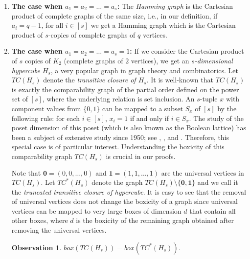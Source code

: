 \documentclass[twoside, 11pt]{article}
\newtheorem{observation}{Observation}
\newcommand{\TCH}[1]{TC(H_ {#1})}
\newcommand{\TTCH}[1]{TC^*(H_ {#1})}
\begin{document}
\begin{enumerate}

\item {\bf The case when $a_1 =a_2 = \ldots = a_s$:} The \textit{Hamming graph} is the Cartesian product of complete graphs of the same size, i.e., in our definition, if $a_i=q-1$, for all $i \in [s]$ we get a Hamming graph which is the Cartesian product of $s$-copies of complete graphs of $q$ vertices. 

\item  {\bf The case when $a_1 =a_2 = \ldots = a_s = 1$:} If we consider the Cartesian product of $s$ copies of $K_2$ (complete graphs of $2$ vertices), we get an \textit{$s$-dimensional hypercube} $H_s$, a very popular graph in graph theory and combinatorics. Let $TC(H_s)$ denote the \textit{transitive closure of $H_s$}.  It is well-known that  $TC(H_s)$ is exactly the comparability graph of the partial order defined on the power set of $[s]$, where the underlying relation is set inclusion. An $s$-tuple $x$ with component values from $\{0,1\}$ can be mapped to a subset $S_x$ of $[s]$ by the following rule: for each $i \in [s]$, 
$x_i = 1$ if and only if $i \in S_x$. The study of the poset dimension of this poset (which is also known as the Boolean lattice) has been a subject of extensive study since 1950; see \cite{dushnik1950concerning}, \cite{spencer1972minimal}, \cite{brightwell1994dimension} and \cite{kostochka1997dimension}. Therefore, this special case is of particular interest.  Understanding the boxicity of this comparability graph $TC(H_s)$ is crucial in our proofs.


Note that $\mathbf{0}=(0,0,\dots,0)$ and $\mathbf{1}=(1,1,\dots,1)$ are the universal vertices in $\TCH{s}$. Let $\TTCH{s}$ denote the graph $\TCH{s}\setminus \{\mathbf{0},\mathbf{1}\}$ and we call it the \textit{truncated transitive closure of hypercube}. It is easy to see that the removal of universal vertices does not change the boxicity of a graph since universal vertices can be mapped to very large boxes of dimension $d$ that contain all other boxes, where $d$ is the boxicity of the remaining graph obtained after removing the universal vertices. 

\begin{observation}
$box(\TCH{s})=box(\TTCH{s})$.
\end{observation}

\end{enumerate}
\end{document}
